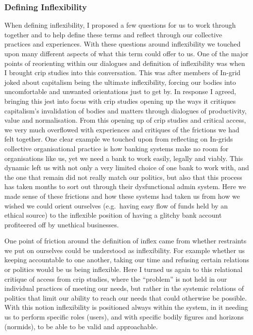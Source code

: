 \hypertarget{defining-inflexibility}{%
\subsubsection[Defining
Inflexibility]{\texorpdfstring{\protect\hypertarget{anchor}{}{}Defining
Inflexibility}{Defining Inflexibility}}\label{defining-inflexibility}}

When defining inflexibility, I proposed a few questions for us to work
through together and to help define these terms and reflect through our
collective practices and experiences. With these questions around
inflexibility we touched upon many different aspects of what this term
could offer to us. One of the major points of reorienting within our
dialogues and definition of inflexibility was when I brought crip
studies into this conversation. This was after members of In-grid joked
about capitalism being the ultimate inflexibility, forcing our bodies
into uncomfortable and unwanted orientations just to get by. In response
I agreed, bringing this jest into focus with crip studies opening up the
ways it critiques capitalism's invalidation of bodies and matters
through dialogues of productivity, value and normalisation. From this
opening up of crip studies and critical access, we very much overflowed
with experiences and critiques of the frictions we had felt together.
One clear example we touched upon from reflecting on In-grids collective
organisational practice is how banking systems make no room for
organisations like us, yet we need a bank to work easily, legally and
viably. This dynamic left us with not only a very limited choice of one
bank to work with, and the one that remain did not really match our
politics, but also that this process has taken months to sort out
through their dysfunctional admin system. Here we made sense of these
frictions and how these systems had taken us from how we wished we could
orient ourselves (e.g.~having easy flow of funds held by an ethical
source) to the inflexible position of having a glitchy bank account
profiteered off by unethical businesses.

One point of friction around the definition of inflex came from whether
restraints we put on ourselves could be understood as inflexibility. For
example whether us keeping accountable to one another, taking our time
and refusing certain relations or politics would be us being inflexible.
Here I turned us again to this relational critique of access from crip
studies, where the ``problem'' is not held in our individual practices
of meeting our needs, but rather in the systemic relations of politics
that limit our ability to reach our needs that could otherwise be
possible. With this notion inflexibility is positioned always within the
system, in it needing us to perform specific roles (users), and with
specific bodily figures and horizons (normids), to be able to be valid
and approachable.

